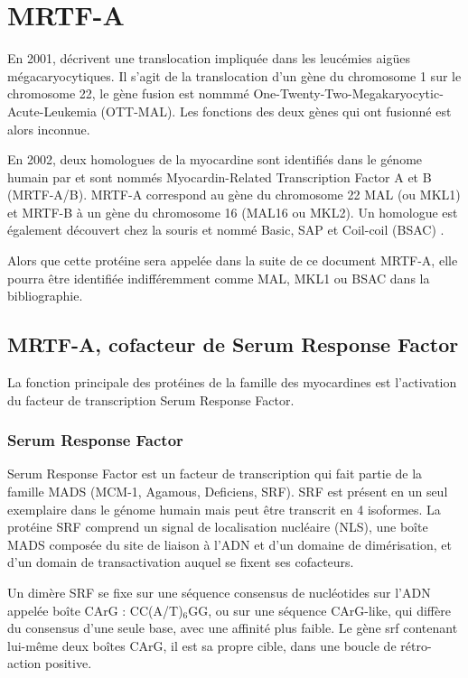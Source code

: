 \documentclass{report}
\begin{document}
\chapter{MRTF-A}
En 2001, \cite{mercher_involvement_2001} 
décrivent une translocation impliquée dans les leucémies aigües mégacaryocytiques. 
Il s'agit de la translocation d'un gène du chromosome 1 sur le chromosome 22, le gène fusion est nommmé One-Twenty-Two-Megakaryocytic-Acute-Leukemia (OTT-MAL). 
Les fonctions des deux gènes qui ont fusionné est alors inconnue. 

En 2002, deux homologues de la myocardine sont identifiés dans le génome humain par \cite{wang_potentiation_2002} et sont nommés Myocardin-Related Transcription Factor A et B (MRTF-A/B).
MRTF-A correspond au gène du chromosome 22 MAL (ou MKL1) et MRTF-B à un gène du chromosome 16 (MAL16 ou MKL2). 
Un homologue est également découvert chez la souris et nommé Basic, SAP et Coil-coil (BSAC) \parencite{sasazuki_identification_2002}. 

Alors que cette protéine sera appelée dans la suite de ce document MRTF-A, elle pourra être identifiée indifféremment comme MAL, MKL1 ou BSAC dans la bibliographie. 

\section{MRTF-A, cofacteur de Serum Response Factor}

La fonction principale des protéines de la famille des myocardines est l'activation du facteur de transcription Serum Response Factor. 

\subsection{Serum Response Factor}

Serum Response Factor est un facteur de transcription qui fait partie de la famille MADS (MCM-1, Agamous, Deficiens, SRF). SRF est présent en un seul exemplaire dans le génome humain mais peut être transcrit en 4 isoformes. 
La protéine SRF comprend un signal de localisation nucléaire (NLS), une boîte MADS composée du site de liaison à l'ADN et d'un domaine de dimérisation, et d'un domain de transactivation auquel se fixent ses cofacteurs. 

Un dimère SRF se fixe sur une séquence consensus de nucléotides sur l'ADN appelée boîte CArG : CC(A/T)$_{6}$GG, ou sur une séquence CArG-like, qui diffère du consensus d'une seule base, avec une affinité plus faible. Le gène srf contenant lui-même deux boîtes CArG, il est sa propre cible, dans une boucle de rétro-action positive. 
\end{document}
